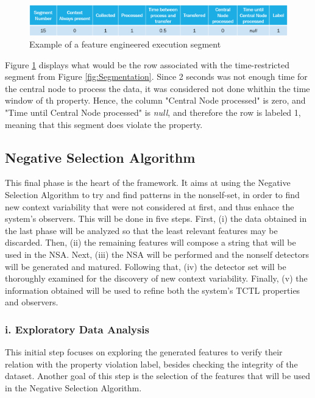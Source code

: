 \begin{figure}[!h]
	\centering
	\includegraphics[width=0.999\textwidth, keepaspectratio]{img/FeatureEngResult.png}
	\caption{Example of a feature engineered execution segment}
	\label{fig:FeatureEngResult}
\end{figure}

Figure \ref{fig:FeatureEngResult} displays what would be the row associated with the time-restricted segment from Figure \ref{fig:Segmentation}. Since 2 seconds was not enough time for the central node to process the data, it was considered not done whithin the time window of th property. Hence, the column "Central Node processed" is zero, and "Time until Central Node processed" is \textit{null}, and therefore the row is labeled 1, meaning that this segment does violate the property.

\subsection{Negative Selection Algorithm}

This final phase is the heart of the framework. It aims at using the Negative Selection Algorithm to try and find patterns in the nonself-set, in order to find new context variability that were not considered at first, and thus enhace the system's observers. This will be done in five steps. First, (i) the data obtained in the last phase will be analyzed so that the least relevant features may be discarded. Then, (ii) the remaining features will compose a string that will be used in the NSA. Next, (iii) the NSA will be performed and the nonself detectors will be generated and matured. Following that, (iv) the detector set will be thoroughly examined for the discovery of new context variability. Finally, (v) the information obtained will be used to refine both the system's TCTL properties and observers.

\subsubsection{i. Exploratory Data Analysis}

This initial step focuses on exploring the generated features to verify their relation with the property violation label, besides checking the integrity of the dataset. Another goal of this step is the selection of the features that will be used in the Negative Selection Algorithm.

